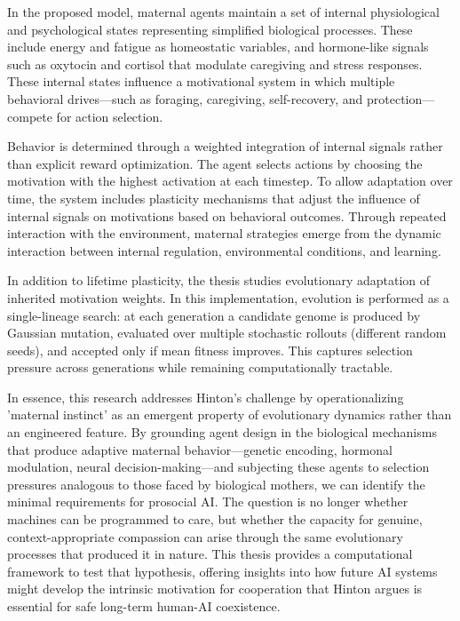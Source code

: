 In the proposed model, maternal agents maintain a set of internal physiological and psychological states representing simplified biological processes. These include energy and fatigue as homeostatic variables, and hormone-like signals such as oxytocin and cortisol that modulate caregiving and stress responses. These internal states influence a motivational system in which multiple behavioral drives—such as foraging, caregiving, self-recovery, and protection—compete for action selection.

Behavior is determined through a weighted integration of internal signals rather than explicit reward optimization. The agent selects actions by choosing the motivation with the highest activation at each timestep. To allow adaptation over time, the system includes plasticity mechanisms that adjust the influence of internal signals on motivations based on behavioral outcomes. Through repeated interaction with the environment, maternal strategies emerge from the dynamic interaction between internal regulation, environmental conditions, and learning.

In addition to lifetime plasticity, the thesis studies evolutionary adaptation of inherited motivation weights. In this implementation, evolution is performed as a single-lineage search: at each generation a candidate genome is produced by Gaussian mutation, evaluated over multiple stochastic rollouts (different random seeds), and accepted only if mean fitness improves. This captures selection pressure across generations while remaining computationally tractable.



In essence, this research addresses Hinton's challenge by operationalizing 'maternal instinct' as an emergent property of evolutionary dynamics rather than an engineered feature. By grounding agent design in the biological mechanisms that produce adaptive maternal behavior—genetic encoding, hormonal modulation, neural decision-making—and subjecting these agents to selection pressures analogous to those faced by biological mothers, we can identify the minimal requirements for prosocial AI. The question is no longer whether machines can be programmed to care, but whether the capacity for genuine, context-appropriate compassion can arise through the same evolutionary processes that produced it in nature. This thesis provides a computational framework to test that hypothesis, offering insights into how future AI systems might develop the intrinsic motivation for cooperation that Hinton argues is essential for safe long-term human-AI coexistence.






